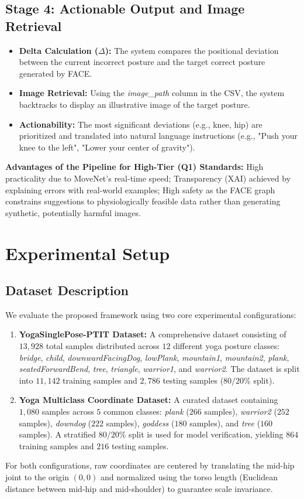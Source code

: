 \documentclass[pdflatex,sn-mathphys-num]{sn-jnl}%
\theoremstyle{thmstyleone}%
\theoremstyle{thmstyletwo}%
\theoremstyle{thmstylethree}%
\begin{document}
\subsection{Stage 4: Actionable Output and Image Retrieval}
\begin{itemize}
    \item \textbf{Delta Calculation ($\Delta$):} The system compares the positional deviation between the current incorrect posture and the target correct posture generated by FACE.
    \item \textbf{Image Retrieval:} Using the \textit{image\_path} column in the CSV, the system backtracks to display an illustrative image of the target posture.
    \item \textbf{Actionability:} The most significant deviations (e.g., knee, hip) are prioritized and translated into natural language instructions (e.g., "Push your knee to the left", "Lower your center of gravity").
\end{itemize}

\textbf{Advantages of the Pipeline for High-Tier (Q1) Standards:} High practicality due to MoveNet's real-time speed; Transparency (XAI) achieved by explaining errors with real-world examples; High safety as the FACE graph constrains suggestions to physiologically feasible data rather than generating synthetic, potentially harmful images.

\section{Experimental Setup}\label{sec:experimental}

\subsection{Dataset Description}
We evaluate the proposed framework using two core experimental configurations:
\begin{enumerate}
    \item \textbf{YogaSinglePose-PTIT Dataset:} A comprehensive dataset consisting of $13,928$ total samples distributed across $12$ different yoga posture classes: \textit{bridge}, \textit{child}, \textit{downwardFacingDog}, \textit{lowPlank}, \textit{mountain1}, \textit{mountain2}, \textit{plank}, \textit{seatedForwardBend}, \textit{tree}, \textit{triangle}, \textit{warrior1}, and \textit{warrior2}. The dataset is split into $11,142$ training samples and $2,786$ testing samples ($80/20\%$ split).
    \item \textbf{Yoga Multiclass Coordinate Dataset:} A curated dataset containing $1,080$ samples across $5$ common classes: \textit{plank} ($266$ samples), \textit{warrior2} ($252$ samples), \textit{downdog} ($222$ samples), \textit{goddess} ($180$ samples), and \textit{tree} ($160$ samples). A stratified $80/20\%$ split is used for model verification, yielding $864$ training samples and $216$ testing samples.
\end{enumerate}
For both configurations, raw coordinates are centered by translating the mid-hip joint to the origin $(0,0)$ and normalized using the torso length (Euclidean distance between mid-hip and mid-shoulder) to guarantee scale invariance.
\end{document}
